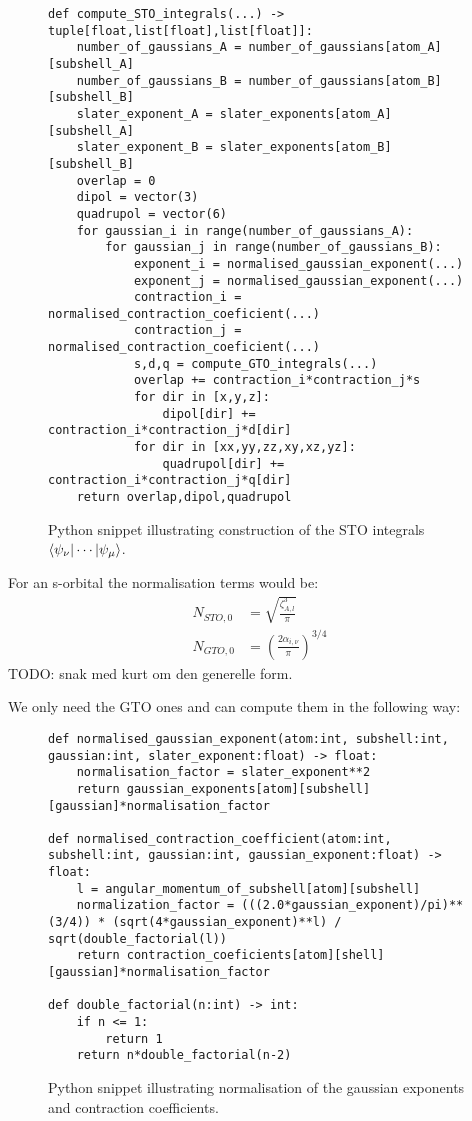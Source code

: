 \begin{figure}[H]
\begin{verbatim}
def compute_STO_integrals(...) -> tuple[float,list[float],list[float]]:
    number_of_gaussians_A = number_of_gaussians[atom_A][subshell_A]
    number_of_gaussians_B = number_of_gaussians[atom_B][subshell_B]
    slater_exponent_A = slater_exponents[atom_A][subshell_A]
    slater_exponent_B = slater_exponents[atom_B][subshell_B]
    overlap = 0
    dipol = vector(3)
    quadrupol = vector(6)
    for gaussian_i in range(number_of_gaussians_A):
        for gaussian_j in range(number_of_gaussians_B):
            exponent_i = normalised_gaussian_exponent(...)
            exponent_j = normalised_gaussian_exponent(...)
            contraction_i = normalised_contraction_coeficient(...)
            contraction_j = normalised_contraction_coeficient(...)
            s,d,q = compute_GTO_integrals(...)
            overlap += contraction_i*contraction_j*s
            for dir in [x,y,z]:
                dipol[dir] += contraction_i*contraction_j*d[dir]
            for dir in [xx,yy,zz,xy,xz,yz]:
                quadrupol[dir] += contraction_i*contraction_j*q[dir]
    return overlap,dipol,quadrupol
\end{verbatim}
    \caption{Python snippet illustrating construction of the STO integrals $\braket{\psi_\nu|\cdots|\psi_\mu}$.}
\end{figure}

For an s-orbital the normalisation terms would be:
\begin{align}
    N_{STO,0}&=\sqrt{\frac{\zeta_{A,l}^3}{\pi}}\\
    N_{GTO,0}&=\left(\frac{2\alpha_{i,\nu}}{\pi}\right)^{3/4}
\end{align}
TODO: snak med kurt om den generelle form.

We only need the GTO ones and can compute them in the following way:
\begin{figure}[H]
\begin{verbatim}
def normalised_gaussian_exponent(atom:int, subshell:int, gaussian:int, slater_exponent:float) -> float:
    normalisation_factor = slater_exponent**2
    return gaussian_exponents[atom][subshell][gaussian]*normalisation_factor

def normalised_contraction_coefficient(atom:int, subshell:int, gaussian:int, gaussian_exponent:float) -> float:
    l = angular_momentum_of_subshell[atom][subshell]
    normalization_factor = (((2.0*gaussian_exponent)/pi)**(3/4)) * (sqrt(4*gaussian_exponent)**l) / sqrt(double_factorial(l))
    return contraction_coeficients[atom][shell][gaussian]*normalisation_factor

def double_factorial(n:int) -> int:
    if n <= 1:
        return 1
    return n*double_factorial(n-2)
\end{verbatim}
    \caption{Python snippet illustrating normalisation of the gaussian exponents and contraction coefficients.}
\end{figure}


